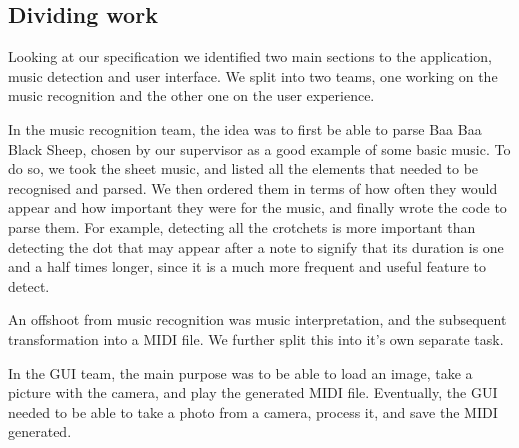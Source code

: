 \subsection{Dividing work}
Looking at our specification we identified two main sections to the application, music detection and user interface. We split into two teams, one working on the music recognition and the other one on the user experience. 
 
In the music recognition team, the idea was to first be able to parse Baa Baa Black Sheep, chosen by our supervisor as a good example of some basic music. To do so, we took the sheet music, and listed all the elements that needed to be recognised and parsed. We then ordered them in terms of how often they would appear and how important they were for the music, and finally wrote the code to parse them. For example, detecting all the crotchets is more important than detecting the dot that may appear after a note to signify that its duration is one and a half times longer, since it is a much more frequent and useful feature to detect.

An offshoot from music recognition was music interpretation, and the subsequent transformation into a MIDI file. We further split this into it's own separate task.

In the GUI team, the main purpose was to be able to load an image, take a picture with the camera, and play the generated MIDI file. Eventually, the GUI needed to be able to take a photo from a camera, process it, and save the MIDI generated.
